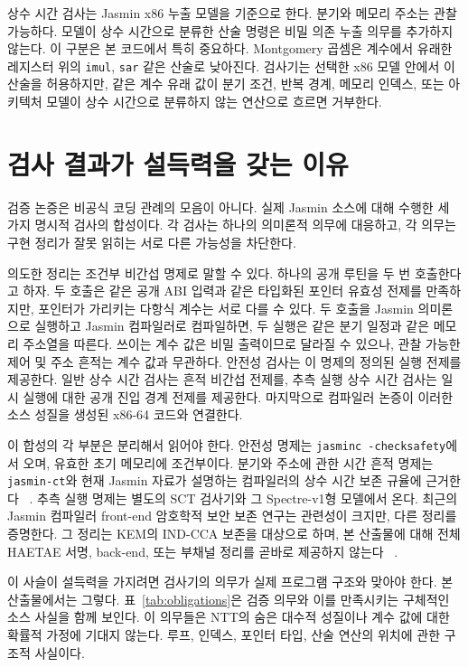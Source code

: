 \documentclass[10pt,twocolumn]{article}
\newcommand{\jasmin}{Jasmin}
\newcommand{\ct}{상수 시간}
\newcommand{\sct}{추측 실행 상수 시간}
\begin{document}
\ct{} 검사는 \jasmin{} x86 누출 모델을 기준으로 한다. 분기와 메모리
주소는 관찰 가능하다. 모델이 상수 시간으로 분류한 산술 명령은 비밀
의존 누출 의무를 추가하지 않는다. 이 구분은 본 코드에서 특히 중요하다.
Montgomery 곱셈은 계수에서 유래한 레지스터 위의 \texttt{imul},
\texttt{sar} 같은 산술로 낮아진다. 검사기는 선택한 x86 모델 안에서
이 산술을 허용하지만, 같은 계수 유래 값이 분기 조건, 반복 경계,
메모리 인덱스, 또는 아키텍처 모델이 상수 시간으로 분류하지 않는 연산으로 흐르면
거부한다.

\section{검사 결과가 설득력을 갖는 이유}

검증 논증은 비공식 코딩 관례의 모음이 아니다. 실제 \jasmin{} 소스에
대해 수행한 세 가지 명시적 검사의 합성이다. 각 검사는 하나의 의미론적
의무에 대응하고, 각 의무는 구현 정리가 잘못 읽히는 서로 다른 가능성을
차단한다.

의도한 정리는 조건부 비간섭 명제로 말할 수 있다. 하나의 공개 루틴을
두 번 호출한다고 하자. 두 호출은 같은 공개 ABI 입력과 같은 타입화된
포인터 유효성 전제를 만족하지만, 포인터가 가리키는 다항식 계수는 서로
다를 수 있다. 두 호출을 \jasmin{} 의미론으로 실행하고 \jasmin{}
컴파일러로 컴파일하면, 두 실행은 같은 분기 일정과 같은 메모리 주소열을
따른다. 쓰이는 계수 값은 비밀 출력이므로 달라질 수 있으나, 관찰 가능한
제어 및 주소 흔적는 계수 값과 무관하다. 안전성 검사는 이 명제의
정의된 실행 전제를 제공한다. 일반 \ct{} 검사는 흔적 비간섭 전제를,
\sct{} 검사는 일시 실행에 대한 공개 진입 경계 전제를 제공한다.
마지막으로 컴파일러 논증이 이러한 소스 성질을 생성된 x86-64 코드와
연결한다.

이 합성의 각 부분은 분리해서 읽어야 한다. 안전성 명제는
\texttt{jasminc -checksafety}에서 오며, 유효한 초기 메모리에 조건부이다.
분기와 주소에 관한 시간 흔적 명제는 \texttt{jasmin-ct}와 현재
\jasmin{} 자료가 설명하는 컴파일러의 \ct{} 보존 규율에 근거한다
~\cite{JasminFramework2026}. 추측 실행 명제는 별도의 SCT 검사기와 그
Spectre-v1형 모델에서 온다. 최근의 \jasmin{} 컴파일러 front-end
암호학적 보안 보존 연구는 관련성이 크지만, 다른 정리를 증명한다. 그
정리는 KEM의 IND-CCA 보존을 대상으로 하며, 본 산출물에 대해 전체
HAETAE 서명, back-end, 또는 부채널 정리를 곧바로 제공하지 않는다
~\cite{ArranzOlmos2025JasminSecurity}.

이 사슬이 설득력을 가지려면 검사기의 의무가 실제 프로그램 구조와
맞아야 한다. 본 산출물에서는 그렇다. 표~\ref{tab:obligations}은
검증 의무와 이를 만족시키는 구체적인 소스 사실을 함께 보인다. 이
의무들은 NTT의 숨은 대수적 성질이나 계수 값에 대한 확률적 가정에
기대지 않는다. 루프, 인덱스, 포인터 타입, 산술 연산의 위치에 관한
구조적 사실이다.
\end{document}
